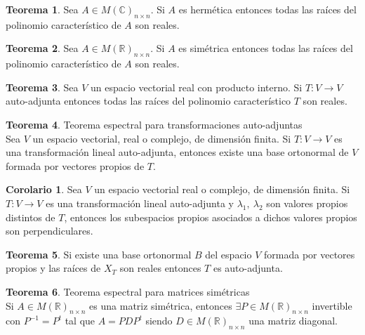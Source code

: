 \documentclass[10pt]{article}
\theoremstyle{definition}
\newtheorem{theorem}{Teorema}[section]
\newtheorem{corollary}{Corolario}[theorem]
\begin{document}
\begin{theorem}
	Sea $A\in M(\mathbb{C})_{n\times n}$. Si $A$ es hermética entonces todas las raíces del polinomio característico de $A$ son reales.
\end{theorem}
\begin{theorem}
	Sea $A\in M(\mathbb{R})_{n\times n}$. Si $A$ es simétrica entonces todas las raíces del polinomio característico de $A$ son reales.
\end{theorem}
\begin{theorem}
	Sea $V$ un espacio vectorial real con producto interno. Si $T:V\to V$ auto-adjunta entonces todas las raíces del polinomio característico $T$ son reales.
\end{theorem}
\begin{theorem}{Teorema espectral para transformaciones auto-adjuntas}
	\\Sea $V$ un espacio vectorial, real o complejo, de dimensión finita. Si $T:V\to V$ es una transformación lineal auto-adjunta, entonces existe una base ortonormal de $V$ formada por vectores propios de $T$.
\end{theorem}
\begin{corollary}
	Sea $V$ un espacio vectorial real o complejo, de dimensión finita. Si $T:V\to V$ es una transformación lineal auto-adjunta y $\lambda_1,\ \lambda_2$ son valores propios distintos de $T$, entonces los subespacios propios asociados a dichos valores propios son perpendiculares.
\end{corollary}
\begin{theorem}
	Si existe una base ortonormal $B$ del espacio $V$ formada por vectores propios y las raíces de $X_T$ son reales entonces $T$ es auto-adjunta.
\end{theorem}
\begin{theorem}{Teorema espectral para matrices simétricas}
    \\Si $A\in M(\mathbb{R})_{n\times n}$ es una matriz simétrica, entonces $\exists P\in M(\mathbb{R})_{n\times n}$ invertible con $P^{-1}=P^t$ tal que $A=PDP^t$ siendo $D\in M(\mathbb{R})_{n\times n}$ una matriz diagonal.
\end{theorem}
\end{document}
